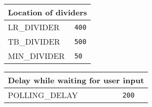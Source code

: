 \documentclass[11pt]{article}
\begin{document}
\begin{center}
\begin{tabular}{|p{}|p{}|}
\hline
\multicolumn{2}{|c|}{Location of dividers}\\ \hline
\textsc{\ttfamily LR\_DIVIDER} &\verb+400+\\
\textsc{\ttfamily TB\_DIVIDER} &\verb+500+\\
\textsc{\ttfamily MIN\_DIVIDER} &\verb+50+\\\hline
\end{tabular}

\bigskip

\begin{tabular}{|p{}|p{}|}
\hline
\multicolumn{2}{|c|}{Delay while waiting for user input}\\ \hline
\textsc{\ttfamily POLLING\_DELAY} &\verb+200+\\\hline
\end{tabular}

\end{center}
\end{document}
